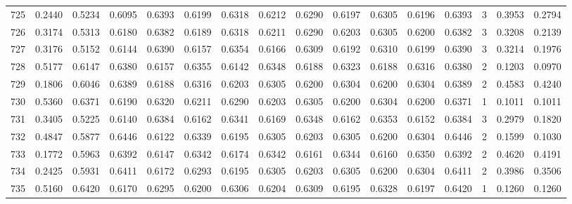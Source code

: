 \begin{tabular}{lrrrrrrrrrrrrrrr}
725 &      0.2440 &  0.5234 &  0.6095 &  0.6393 &  0.6199 &  0.6318 &  0.6212 &  0.6290 &  0.6197 &  0.6305 &   0.6196 &     0.6393 &      3 &                    0.3953 &                     0.2794 \\
726 &      0.3174 &  0.5313 &  0.6180 &  0.6382 &  0.6189 &  0.6318 &  0.6211 &  0.6290 &  0.6203 &  0.6305 &   0.6200 &     0.6382 &      3 &                    0.3208 &                     0.2139 \\
727 &      0.3176 &  0.5152 &  0.6144 &  0.6390 &  0.6157 &  0.6354 &  0.6166 &  0.6309 &  0.6192 &  0.6310 &   0.6199 &     0.6390 &      3 &                    0.3214 &                     0.1976 \\
728 &      0.5177 &  0.6147 &  0.6380 &  0.6157 &  0.6355 &  0.6142 &  0.6348 &  0.6188 &  0.6323 &  0.6188 &   0.6316 &     0.6380 &      2 &                    0.1203 &                     0.0970 \\
729 &      0.1806 &  0.6046 &  0.6389 &  0.6188 &  0.6316 &  0.6203 &  0.6305 &  0.6200 &  0.6304 &  0.6200 &   0.6304 &     0.6389 &      2 &                    0.4583 &                     0.4240 \\
730 &      0.5360 &  0.6371 &  0.6190 &  0.6320 &  0.6211 &  0.6290 &  0.6203 &  0.6305 &  0.6200 &  0.6304 &   0.6200 &     0.6371 &      1 &                    0.1011 &                     0.1011 \\
731 &      0.3405 &  0.5225 &  0.6140 &  0.6384 &  0.6162 &  0.6341 &  0.6169 &  0.6348 &  0.6162 &  0.6353 &   0.6152 &     0.6384 &      3 &                    0.2979 &                     0.1820 \\
732 &      0.4847 &  0.5877 &  0.6446 &  0.6122 &  0.6339 &  0.6195 &  0.6305 &  0.6203 &  0.6305 &  0.6200 &   0.6304 &     0.6446 &      2 &                    0.1599 &                     0.1030 \\
733 &      0.1772 &  0.5963 &  0.6392 &  0.6147 &  0.6342 &  0.6174 &  0.6342 &  0.6161 &  0.6344 &  0.6160 &   0.6350 &     0.6392 &      2 &                    0.4620 &                     0.4191 \\
734 &      0.2425 &  0.5931 &  0.6411 &  0.6172 &  0.6293 &  0.6195 &  0.6305 &  0.6203 &  0.6305 &  0.6200 &   0.6304 &     0.6411 &      2 &                    0.3986 &                     0.3506 \\
735 &      0.5160 &  0.6420 &  0.6170 &  0.6295 &  0.6200 &  0.6306 &  0.6204 &  0.6309 &  0.6195 &  0.6328 &   0.6197 &     0.6420 &      1 &                    0.1260 &                     0.1260 \\

\end{tabular}
